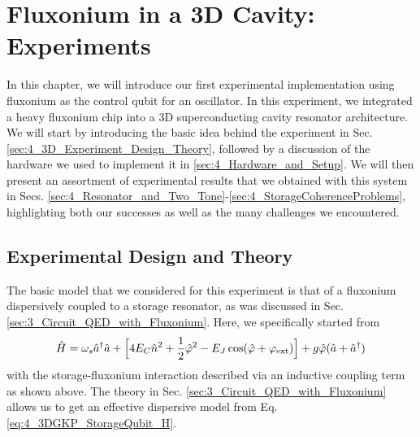 \chapter{Fluxonium in a 3D Cavity: Experiments\label{ch:4_3DGKP}}
In this chapter, we will introduce our first experimental implementation using fluxonium as the control qubit for an oscillator. In this experiment, we integrated a heavy fluxonium chip into a 3D superconducting cavity resonator architecture. We will start by introducing the basic idea behind the experiment in Sec. \ref{sec:4_3D_Experiment_Design_Theory}, followed by a discussion of the hardware we used to implement it in \ref{sec:4_Hardware_and_Setup}. We will then present an assortment of experimental results that we obtained with this system in Secs. \ref{sec:4_Resonator_and_Two_Tone}-\ref{sec:4_StorageCoherenceProblems}, highlighting both our successes as well as the many challenges we encountered.  



\section{Experimental Design and Theory \label{sec:4_3D_Experiment_Design_Theory}}
The basic model that we considered for this experiment is that of a fluxonium dispersively coupled to a storage resonator, as was discussed in Sec. \ref{sec:3_Circuit_QED_with_Fluxonium}. Here, we specifically started from 
\begin{equation}
    \hat{H} = \omega_s \hat{a}^\dagger \hat{a} + \Big[4E_C \hat{n}^2 + \frac{1}{2}\hat{\varphi}^2 - E_J\cos(\hat{\varphi}+\varphi_{\rm ext})\Big] + g\hat{\varphi}(\hat{a} + \hat{a}^\dagger)
    \label{eq:4_3DGKP_StorageQubit_H}
\end{equation}
with the storage-fluxonium interaction described via an inductive coupling term as shown above. The theory in Sec. \ref{sec:3_Circuit_QED_with_Fluxonium} allows us to get an effective dispersive model from Eq. \eqref{eq:4_3DGKP_StorageQubit_H}. 

